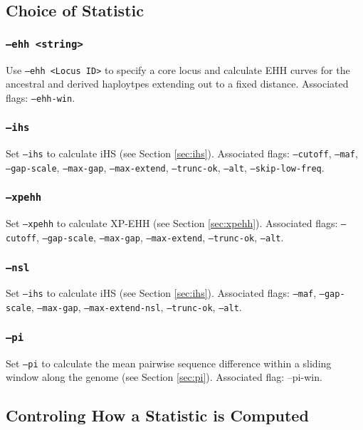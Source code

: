 \documentclass[12pt]{article}%
\begin{document}
\subsection{Choice of Statistic}

\subsubsection{{\tt --ehh <string>}}

Use {\tt --ehh <Locus ID>} to specify a core locus and calculate EHH curves for the ancestral and derived haploytpes extending out to a fixed distance.  Associated flags: {\tt --ehh-win}.

\subsubsection{{\tt --ihs}}

Set {\tt --ihs} to calculate iHS (see Section \ref{sec:ihs}).  Associated flags: {\tt --cutoff}, {\tt --maf}, {\tt --gap-scale}, {\tt --max-gap}, {\tt --max-extend}, {\tt --trunc-ok}, {\tt --alt}, {\tt --skip-low-freq}.

\subsubsection{{\tt --xpehh}}

Set {\tt --xpehh} to calculate XP-EHH (see Section \ref{sec:xpehh}).  Associated flags: {\tt --cutoff}, {\tt --gap-scale}, {\tt --max-gap}, {\tt --max-extend}, {\tt --trunc-ok}, {\tt --alt}.

\subsubsection{{\tt --nsl}}

Set {\tt --ihs} to calculate iHS (see Section \ref{sec:ihs}).  Associated flags: {\tt --maf}, {\tt --gap-scale}, {\tt --max-gap}, {\tt --max-extend-nsl}, {\tt --trunc-ok}, {\tt --alt}.

\subsubsection{{\tt --pi}}

Set {\tt --pi} to calculate the mean pairwise sequence difference within a sliding window along the genome (see Section \ref{sec:pi}).  Associated flag: {--pi-win}.

\subsection{Controling How a Statistic is Computed}
\end{document}
